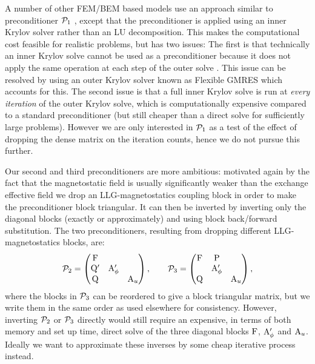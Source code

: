 A number of other FEM/BEM based models use an approach similar to preconditioner $\mathcal{P}_1$ \cite{Suess2002}, except that the preconditioner is applied using an inner Krylov solver rather than an LU decomposition.
This makes the computational cost feasible for realistic problems, but has two issues:
The first is that technically an inner Krylov solve cannot be used as a preconditioner because it does not apply the same operation at each step of the outer solve \cite{Saad1993}.
This issue can be resolved by using an outer Krylov solver known as Flexible GMRES which accounts for this.
The second issue is that a full inner Krylov solve is run at \emph{every iteration} of the outer Krylov solve, which is computationally expensive compared to a standard preconditioner (but still cheaper than a direct solve for sufficiently large problems).
However we are only interested in $\mathcal{P}_1$ as a test of the effect of dropping the dense matrix on the iteration counts, hence we do not pursue this further.

Our second and third preconditioners are more ambitious: motivated again by the fact that the magnetostatic field is usually significantly weaker than the exchange effective field we drop an LLG-magnetostatics coupling block in order to make the preconditioner block triangular.
It can then be inverted by inverting only the diagonal blocks (exactly or approximately) and using block back/forward substitution.
The two preconditioners, resulting from dropping different LLG-magnetostatics blocks, are:
\begin{equation}
  \mathcal{P}_2 =
  \begin{pmatrix}
    \mathrm{F}       &           &  \\
    \mathrm{Q}'       & \mathrm{A}_\phi'&   \\
    \mathrm{Q}       &           &   \mathrm{A}_u
  \end{pmatrix},
  \qquad
  \mathcal{P}_3 =
  \begin{pmatrix}
    \mathrm{F}       & \mathrm{P}       &  \\
    & \mathrm{A}_\phi' &   \\
    \mathrm{Q}       &           &   \mathrm{A}_u
  \end{pmatrix},
  \label{eq:ms-block-prec-drop-p}
\end{equation}
where the blocks in $\mathcal{P}_3$ can be reordered to give a block triangular matrix, but we write them in the same order as used elsewhere for consistency.
However, inverting $\mathcal{P}_2$ or $\mathcal{P}_3$ directly would still require an expensive, in terms of both memory and set up time, direct solve of the three diagonal blocks $\mathrm{F}$, $\mathrm{A}_\phi'$ and $\mathrm{A}_u$.
Ideally we want to approximate these inverses by some cheap iterative process instead.

